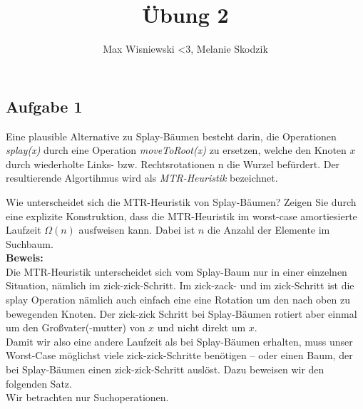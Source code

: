 \documentclass[11pt,a4paper,ngerman]{article}
\date{}
\title{Übung 2}
\author{Max Wisniewski <3, Melanie Skodzik}
\begin{document}

\renewcommand{\figurename}{Figure}

\maketitle
\thispagestyle{fancy}


\subsection*{Aufgabe 1}

Eine plausible Alternative zu Splay-Bäumen besteht darin, die Operationen \emph{splay(x)} durch eine Operation \emph{moveToRoot(x)} zu ersetzen, welche den Knoten $x$ durch wiederholte Links- bzw. Rechtsrotationen n die Wurzel befürdert. Der resultierende Algortihmus wird als \emph{MTR-Heuristik} bezeichnet.

Wie unterscheidet sich die MTR-Heuristik von Splay-Bäumen? Zeigen Sie durch eine explizite Konstruktion, dass die MTR-Heuristik im worst-case amortiesierte Laufzeit $\Omega(n)$ ausfweisen kann. Dabei ist $n$ die Anzahl der Elemente im Suchbaum.\\

\noindent\textbf{Beweis:}\\

Die MTR-Heuristik unterscheidet sich vom Splay-Baum nur in einer einzelnen Situation, nämlich im zick-zick-Schritt. Im zick-zack- und im zick-Schritt ist die splay Operation nämlich auch einfach eine eine Rotation um den nach oben zu bewegenden Knoten. Der zick-zick Schritt bei Splay-Bäumen rotiert aber einmal um den Großvater(-mutter) von $x$ und nicht direkt um $x$.\\

Damit wir also eine andere Laufzeit als bei Splay-Bäumen erhalten, muss unser Worst-Case möglichst viele zick-zick-Schritte benötigen -- oder einen Baum, der bei Splay-Bäumen einen zick-zick-Schritt auslöst. Dazu beweisen wir den folgenden Satz.\\

Wir betrachten nur Suchoperationen.
\end{document}
